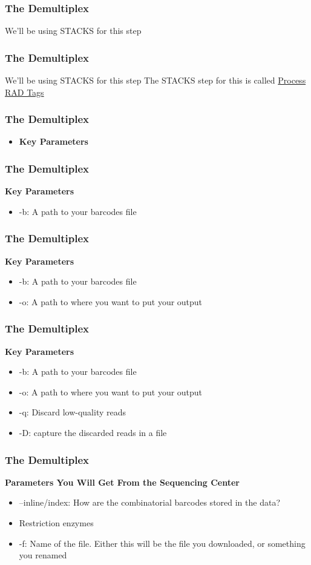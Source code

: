\documentclass{beamer}
\begin{document}
\begin{frame}
\frametitle{The Demultiplex}
We'll be using STACKS for this step
\end{frame}

\begin{frame}
\frametitle{The Demultiplex}
We'll be using STACKS for this step
The STACKS step for this is called \href{http://catchenlab.life.illinois.edu/stacks/comp/process_radtags.php}{Process RAD Tags} 
\end{frame}

\begin{frame}
\frametitle{The Demultiplex}
\begin{itemize}
\item \noindent \textbf{Key Parameters}
\end{itemize}
\end{frame}

\begin{frame}
\frametitle{The Demultiplex}
\noindent \textbf{Key Parameters}
\begin{itemize}
\item -b: A path to your barcodes file
\end{itemize}
\end{frame}

\begin{frame}
\frametitle{The Demultiplex}
\noindent \textbf{Key Parameters}
\begin{itemize}
\item -b: A path to your barcodes file
\item -o: A path to where you want to put your output
\end{itemize}
\end{frame}

\begin{frame}
\frametitle{The Demultiplex}
\noindent \textbf{Key Parameters}
\begin{itemize}
\item -b: A path to your barcodes file
\item -o: A path to where you want to put your output
\item -q: Discard low-quality reads
\item -D: capture the discarded reads in a file
\end{itemize}
\end{frame}

\begin{frame}
\frametitle{The Demultiplex}
\noindent \textbf{Parameters You Will Get From the Sequencing Center}
\begin{itemize}
\item --inline/index: How are the combinatorial barcodes stored in the data?
\item Restriction enzymes
\item -f: Name of the file. Either this will be the file you downloaded, or something you renamed
\end{itemize}
\end{frame}
\end{document}

